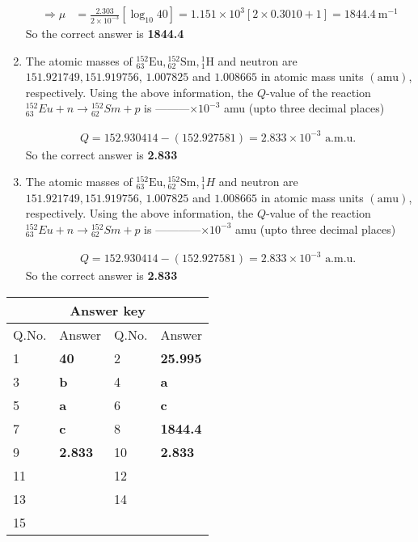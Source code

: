 \begin{enumerate}
\begin{answer}
\begin{align*}
		\Rightarrow \mu&=\frac{2.303}{2 \times 10^{-3}}\left[\log _{10} 40\right]=1.151 \times 10^3[2 \times 0.3010+1]=1844.4 \mathrm{~m}^{-1}
		\end{align*}
		So the correct answer is \textbf{1844.4}
	\end{answer}
	\item The atomic masses of ${ }_{63}^{152} \mathrm{Eu},{ }_{62}^{152} \mathrm{Sm},{ }_1^1 \mathrm{H}$ and neutron are $151.921749,151.919756$, $1.007825$ and $1.008665$ in atomic mass units $(\mathrm{amu})$, respectively. Using the above information, the $Q$-value of the reaction ${ }_{63}^{152} E u+n \rightarrow{ }_{62}^{152} S m+p$ is ---------$\times 10^{-3}$ amu (upto three decimal places)
	{}
	\begin{answer}
		\begin{align*}
		Q=152.930414-(152.927581)=2.833 \times 10^{-3} \text { a.m.u. }
		\end{align*}
		So the correct answer is \textbf{2.833}
	\end{answer}
	\item The atomic masses of ${ }_{63}^{152} \mathrm{Eu},{ }_{62}^{152} \mathrm{Sm},{ }_1^1 H$ and neutron are $151.921749,151.919756$, $1.007825$ and $1.008665$ in atomic mass units $(\mathrm{amu})$, respectively. Using the above information, the $Q$-value of the reaction ${ }_{63}^{152} E u+n \rightarrow{ }_{62}^{152} S m+p$ is ------------$\times 10^{-3}$ amu (upto three decimal places)
{}
\begin{answer}
	\begin{align*}
	Q=152.930414-(152.927581)=2.833 \times 10^{-3} \text { a.m.u. }
	\end{align*}
	So the correct answer is \textbf{2.833}
\end{answer}
\end{enumerate}
\setlength\arrayrulewidth{1pt}
\begin{table}[H]
	\centering
	\begin{tabular}{|p{1.5cm}|p{1.5cm}||p{1.5cm}|p{1.5cm}|}
		\hline
		\multicolumn{4}{|c|}{\textbf{Answer key}}\\\hline\hline
		\rowcolor{ocrel}Q.No.&Answer&Q.No.&Answer\\\hline
		1&\textbf{40} &2&\textbf{25.995}\\\hline 
		3&\textbf{b} &4&\textbf{a} \\\hline
		5&\textbf{a} &6&\textbf{c} \\\hline
		7&\textbf{c}&8&\textbf{1844.4}\\\hline
		9&\textbf{2.833}&10&\textbf{2.833}\\\hline
		11&\textbf{} &12&\textbf{}\\\hline
		13&\textbf{}&14&\textbf{}\\\hline
		15&\textbf{}& &\\\hline
		
	\end{tabular}
\end{table}